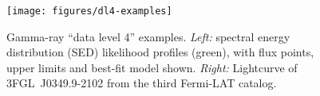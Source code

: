 \begin{figure}[tb]
\centerline{\texttt{[image: figures/dl4-examples]}}
\caption{
Gamma-ray ``data level 4'' examples. \emph{Left:} spectral energy distribution (SED) likelihood profiles (green), with flux points, upper limits and best-fit model shown. \emph{Right:} Lightcurve of 3FGL~J0349.9-2102 from the third Fermi-LAT catalog.
}
\label{fig:dl4-examples}
\end{figure}
